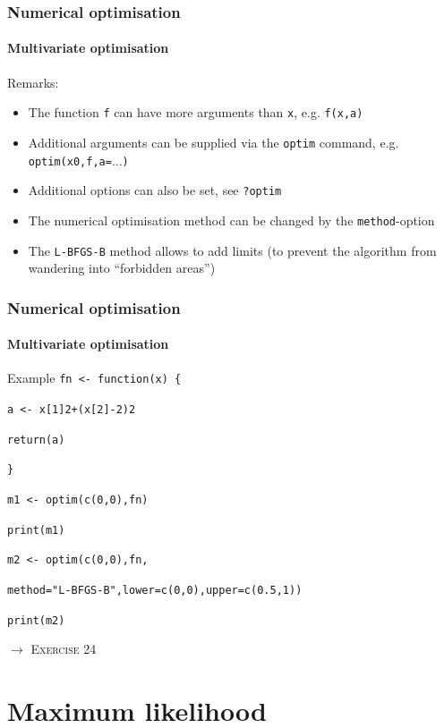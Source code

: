 \documentclass[title={Introduction to R}, author={Mutschler and Zaharieva}, inst={Institute for Econometrics and Empirical Economics}]{beamer}
\begin{document}
\begin{frame}
\frametitle{Numerical optimisation}
\framesubtitle{Multivariate optimisation}
Remarks:
\begin{itemize}
\item The function \texttt{f} can have more arguments than \texttt{x}, e.g. \texttt{f(x,a)}
\item Additional arguments can be supplied via the \texttt{optim} command,
e.g. \texttt{optim(x0,f,a=}$\mathtt{\ldots }$\texttt{)}
\item Additional options can also be set, see \texttt{?optim}
\item The numerical optimisation method can be changed by the \texttt{method}-option
\item The \texttt{L-BFGS-B} method allows to add limits (to prevent the
algorithm from wandering into \textquotedblleft forbidden
areas\textquotedblright )
\end{itemize}
\end{frame}


\begin{frame}
\frametitle{Numerical optimisation}
\framesubtitle{Multivariate optimisation}
\begin{block}{Example}
\texttt{fn <- function(x) \{}

\quad \texttt{a <- x[1]2+(x[2]-2)2}

\quad \texttt{return(a)}

\texttt{\}}

\texttt{m1 <- optim(c(0,0),fn)}

\texttt{print(m1)}

\texttt{m2 <- optim(c(0,0),fn,}

\quad \texttt{method="L-BFGS-B",lower=c(0,0),upper=c(0.5,1))}

\texttt{print(m2)}
\end{block}\pause
$\longrightarrow $ \textsc{Exercise 24}
\end{frame}


\section{Maximum likelihood}
\end{document}
